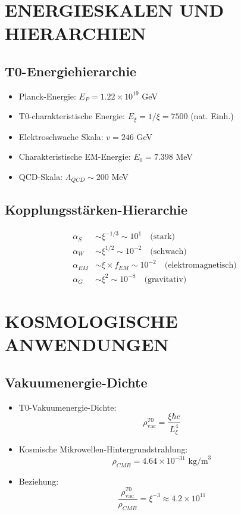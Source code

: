 	\section{ENERGIESKALEN UND HIERARCHIEN}
	
	\subsection{T0-Energiehierarchie}
	\begin{itemize}
		\item Planck-Energie: $E_P = 1.22 \times 10^{19}$ GeV
		\item T0-charakteristische Energie: $E_\xi = 1/\xi = 7500$ (nat. Einh.)
		\item Elektroschwache Skala: $v = 246$ GeV
		\item Charakteristische EM-Energie: $E_0 = 7.398$ MeV
		\item QCD-Skala: $\Lambda_{QCD} \sim 200$ MeV
	\end{itemize}
	
	\subsection{Kopplungsstärken-Hierarchie}
	\begin{align}
		\alpha_S &\sim \xi^{-1/3} \sim 10^{1} \quad \text{(stark)}\\
		\alpha_W &\sim \xi^{1/2} \sim 10^{-2} \quad \text{(schwach)}\\
		\alpha_{EM} &\sim \xi \times f_{EM} \sim 10^{-2} \quad \text{(elektromagnetisch)}\\
		\alpha_G &\sim \xi^2 \sim 10^{-8} \quad \text{(gravitativ)}
	\end{align}
	
	\section{KOSMOLOGISCHE ANWENDUNGEN}
	
	\subsection{Vakuumenergie-Dichte}
	\begin{itemize}
		\item T0-Vakuumenergie-Dichte:
		$$\rho_{\text{vac}}^{T0} = \frac{\xi \hbar c}{L_\xi^4}$$
		
		\item Kosmische Mikrowellen-Hintergrundstrahlung:
		$$\rho_{CMB} = 4.64 \times 10^{-31} \text{ kg/m}^3$$
		
		\item Beziehung:
		$$\frac{\rho_{\text{vac}}^{T0}}{\rho_{CMB}} = \xi^{-3} \approx 4.2 \times 10^{11}$$
	\end{itemize}

